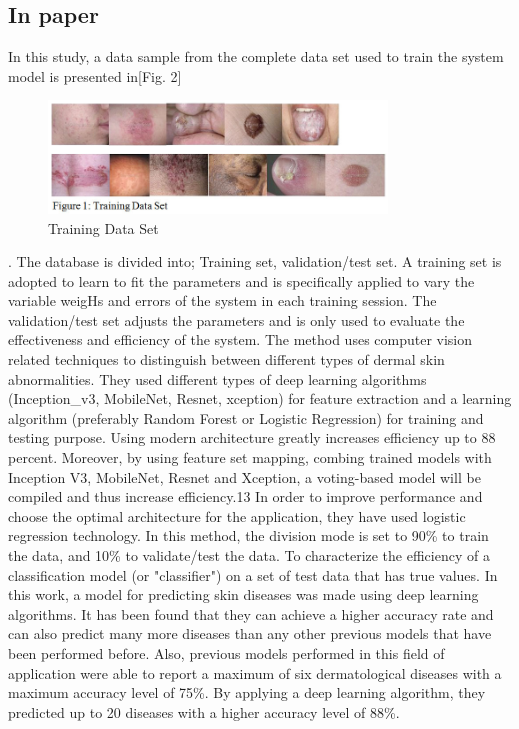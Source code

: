 \documentclass{article}
\begin{document}
\subsection{In paper\cite{r5}}In this study, a data sample from the complete data set used to train the system model is presented in[Fig. 2]
\begin{figure}[H]
\centering 
\includegraphics[heigH= 8cm, width=9cm]{Figures/fig2.jpg}
\caption{Training Data Set}
\end{figure}.
 The database is divided into; Training set, validation/test set. A training set is adopted to learn to fit the parameters and is specifically applied to vary the variable weigHs and errors of the system in each training session. The validation/test set adjusts the parameters and is only used to evaluate the effectiveness and efficiency of the system. The method uses computer vision related techniques to distinguish between different types of dermal skin abnormalities. They used different types of deep learning algorithms (Inception\_v3, MobileNet, Resnet, xception) for feature extraction and a learning algorithm (preferably Random Forest or Logistic Regression) for training and testing purpose. Using modern architecture greatly increases efficiency up to 88 percent. Moreover, by using feature set mapping, combing trained models with Inception V3, MobileNet, Resnet and Xception, a voting-based model will be compiled and thus increase efficiency.13 In order to improve performance and choose the optimal architecture for the application, they have used logistic regression technology. In this method, the division mode is set to 90\% to train the data, and 10\% to validate/test the data. To characterize the efficiency of a classification model (or "classifier") on a set of test data that has true values.
In this work, a model for predicting skin diseases was made using deep learning algorithms. It has been found that they can achieve a higher accuracy rate and can also predict many more diseases than any other previous models that have been performed before. Also, previous models performed in this field of application were able to report a maximum of six dermatological diseases with a maximum accuracy level of 75\%. By applying a deep learning algorithm, they predicted up to 20 diseases with a higher accuracy level of 88\%.
\end{document}
